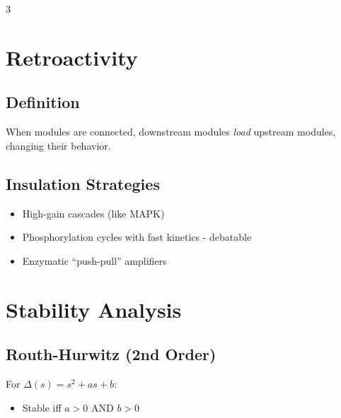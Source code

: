 \documentclass[10pt,landscape,letter]{article}
\begin{document}
\begin{multicols}{3}
\section{Retroactivity}

\subsection{Definition}
When modules are connected, downstream modules \textit{load} upstream modules, changing their behavior.


\subsection{Insulation Strategies}
\begin{itemize}
\item High-gain cascades (like MAPK)
\item Phosphorylation cycles with fast kinetics - debatable
\item Enzymatic ``push-pull'' amplifiers
\end{itemize}

\section{Stability Analysis}

\subsection{Routh-Hurwitz (2nd Order)}
For $\Delta(s) = s^2 + as + b$:
\begin{itemize}
\item Stable iff $a > 0$ AND $b > 0$
\end{itemize}


\end{multicols}
\end{document}
